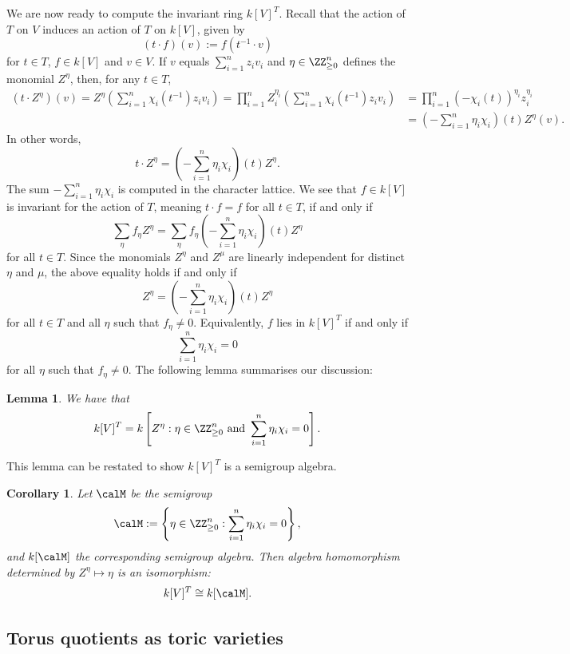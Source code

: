 \documentclass[12pt]{amsart}
\theoremstyle{plain}
\newtheorem{corollary}[theorem]{Corollary}
\newtheorem{lemma}[theorem]{Lemma}
\begin{document}
We are now ready to compute the invariant ring $k[V]^T$.
Recall that the action of $T$ on $V$ induces an action of $T$ on $k[V]$, given by
$$(t \cdot f)(v) := f(t^{-1} \cdot v)$$
for $t \in T$, $f \in k[V]$ and $v \in V$.
If $v$ equals $\sum_{i=1}^n z_i v_i$ and $\eta \in \ZZ_{\ge 0}^n$ defines the monomial $Z^\eta$, then, for any $t \in T$,
\begin{align*}
	(t \cdot Z^\eta)(v) = Z^\eta \left( \sum_{i=1}^n \chi_i(t^{-1}) z_i v_i\right) 
	= \prod_{i=1}^n Z_i^{\eta_i}\left( \sum_{i=1}^n \chi_i(t^{-1}) z_i v_i\right) 
	&= \prod_{i=1}^n \left(- \chi_i(t)\right)^{\eta_i} z_i^{\eta_i} \\
	&= \left(-\sum_{i=1}^n \eta_i \chi_i \right)(t) Z^\eta(v).
\end{align*}
In other words,
$$t \cdot Z^\eta = \left(-\sum_{i=1}^n \eta_i \chi_i \right)(t) Z^\eta.$$
The sum $-\sum_{i=1}^n \eta_i \chi_i$ is computed in the character lattice.
We see that $f \in k[V]$ is invariant for the action of $T$, meaning $t\cdot f =f$ for all $t \in T$, if and only if
$$\sum_\eta f_\eta Z^\eta = \sum_\eta f_\eta \left(-\sum_{i=1}^n \eta_i \chi_i \right)(t) Z^\eta$$
for all $t \in T$.
Since the monomials $Z^\eta$ and $Z^\mu$ are linearly independent for distinct $\eta$ and $\mu$, the above equality holds if and only if
$$Z^\eta = \left(-\sum_{i=1}^n \eta_i \chi_i \right)(t) Z^\eta$$
for all $t \in T$ and all $\eta$ such that $f_\eta \ne 0$.
Equivalently, $f$ lies in $k[V]^T$ if and only if 
$$\sum_{i=1}^n \eta_i \chi_i = 0$$
for all $\eta$ such that $f_\eta \ne 0$.
The following lemma summarises our discussion:

\begin{lemma}
We have that
$$k[V]^T = k \left[Z^\eta : \eta \in \ZZ_{\ge 0}^n \text{ and } \sum_{i=1}^n \eta_i \chi_i = 0 \right].$$
\end{lemma}

This lemma can be restated to show $k[V]^T$ is a semigroup algebra.

\begin{corollary}
Let $\calM$ be the semigroup
$$\calM := \left\{\eta \in \ZZ_{\ge 0}^n : \sum_{i=1}^n \eta_i \chi_i = 0 \right\},$$
and $k[\calM]$ the corresponding semigroup algebra.
Then algebra homomorphism determined by $Z^\eta \mapsto \eta$ is an isomorphism:
$$k[V]^T \cong k[\calM].$$

\end{corollary}

\subsection{Torus quotients as toric varieties}
\end{document}

